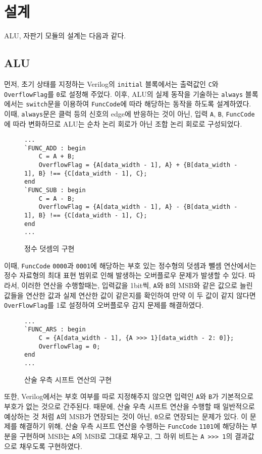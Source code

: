 \documentclass[openright, a4paper]{article}
\newcommand{\code}[1]{\texttt{#1}}
\begin{document}
\section{설계}
ALU, 자판기 모듈의 설계는 다음과 같다.

\subsection{ALU}
먼저, 초기 상태를 지정하는 Verilog의 \code{initial} 블록에서는 출력값인 \code{C}와 
\code{OverflowFlag}를 \code{0}로 설정해 주었다. 이후, ALU의 실제 동작을 기술하는 
\code{always} 블록에서는 \code{switch}문을 이용하여 \code{FuncCode}에 따라 
해당하는 동작을 하도록 설계하였다. 이때, \code{always}문은 클럭 등의 신호의 edge에
반응하는 것이 아닌, 입력 \code{A}, \code{B}, \code{FuncCode}에 따라 변화하므로 ALU는
순차 논리 회로가 아닌 조합 논리 회로로 구성되었다.

\hfill \break
\begin{figure}[h]
    \centering
    \begin{verbatim}
...
`FUNC_ADD : begin
    C = A + B;
    OverflowFlag = {A[data_width - 1], A} + {B[data_width - 1], B} !== {C[data_width - 1], C};
end
`FUNC_SUB : begin
    C = A - B;
    OverflowFlag = {A[data_width - 1], A} - {B[data_width - 1], B} !== {C[data_width - 1], C};
end
...
    \end{verbatim}
    \caption{정수 덧셈의 구현}
\end{figure}
\hfill \break

이때, \code{FuncCode} \code{0000}과 \code{0001}에 해당하는 부호 있는 정수형의 덧셈과 뺄셈
연산에서는 정수 자료형의 최대 표현 범위로 인해 발생하는 오버플로우 문제가 발생할 수 있다.
따라서, 이러한 연산을 수행할때는, 입력값을 1bit씩, \code{A}와 \code{B}의 MSB와 같은 값으로 늘린 값들을 연산한 값과
실제 연산한 값이 같은지를 확인하여 만약 이 두 값이 같지 않다면 \code{OverFlowFlag}를 1로 설정하여
오버플로우 감지 문제를 해결하였다.

\hfill \break
\begin{figure}[h]
    \begin{verbatim}
...
`FUNC_ARS : begin
    C = {A[data_width - 1], {A >>> 1}[data_width - 2: 0]};
    OverflowFlag = 0;
end
...
    \end{verbatim}
    \caption{산술 우측 시프트 연산의 구현}
\end{figure}
\hfill \break

또한, Verilog에서는 부호 여부를 따로 지정해주지 않으면 입력인 \code{A}와 \code{B}가
기본적으로 부호가 없는 것으로 간주된다. 때문에, 산술 우측 시프트 연산을 수행할 때
일반적으로 예상하는 것 처럼 \code{A}의 MSB가 연장되는 것이 아닌, \code{0}으로 연장되는
문제가 있다. 이 문제를 해결하기 위해, 산술 우측 시프트 연산을 수행하는 \code{FuncCode} \code{1101}에
해당하는 부분을 구현하며 MSB는 \code{A}의 MSB로 그대로 채우고, 그 하위 비트는 \code{A >>> 1}의
결과값으로 채우도록 구현하였다.
\end{document}
